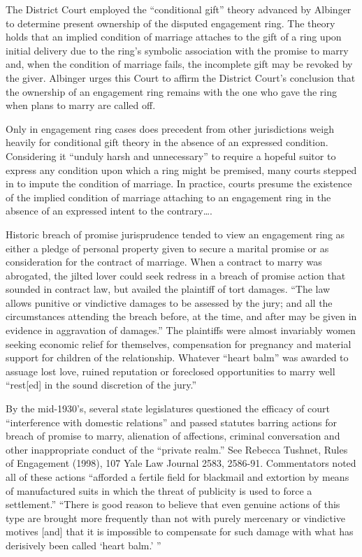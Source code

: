The District Court employed the ``conditional gift'' theory advanced by Albinger
to determine present ownership of the disputed engagement ring. The theory
holds that an implied condition of marriage attaches to the gift of a ring upon
initial delivery due to the  ring's symbolic association with the promise to
marry and, when the condition of marriage fails, the incomplete gift may be
revoked by the giver. Albinger urges this Court to affirm the District Court's
conclusion that the ownership of an engagement ring remains with the one who
gave the ring when plans to marry are called off.

Only in engagement ring cases does precedent from other jurisdictions weigh
heavily for conditional gift theory in the absence of an expressed condition.
Considering it ``unduly harsh and unnecessary'' to require a hopeful suitor to
express any condition upon which a ring might be premised, many courts stepped
in to impute the condition of marriage. In practice, courts presume the
existence of the implied condition of marriage attaching to an engagement ring
in the absence of an expressed intent to the contrary\dots.


Historic breach of promise jurisprudence tended to view an engagement ring as
either a pledge of personal property given to secure a marital promise or as
consideration for the contract of marriage. When a contract to marry was
abrogated, the jilted lover could seek redress in a breach of promise action
that sounded in contract law, but availed the plaintiff of tort damages. ``The
law allows punitive or vindictive damages to be assessed by the jury; and all
the circumstances attending the breach before, at the time, and after may be
given in evidence in aggravation of damages.'' The plaintiffs were almost
invariably women seeking economic relief for themselves, compensation for
pregnancy and material support for children of the relationship. Whatever
``heart balm'' was awarded to assuage lost love, ruined reputation or
foreclosed opportunities to marry well ``rest[ed] in the sound discretion of
the jury.'' 

By the mid-1930's, several state legislatures questioned the efficacy of court
``interference with domestic relations'' and passed statutes barring actions
for breach of promise to marry, alienation of affections, criminal conversation
and other inappropriate conduct of the ``private realm.'' See Rebecca Tushnet,
Rules of Engagement (1998), 107 Yale Law Journal 2583, 2586-91. Commentators
noted all of these  actions ``afforded a fertile field for blackmail and
extortion by means of manufactured suits in which the threat of publicity is
used to force a settlement.'' ``There is good reason to believe that even
genuine actions of this type are brought more frequently than not with purely
mercenary or vindictive motives [and] that it is impossible to compensate for
such damage with what has derisively been called `heart balm.' '' 

